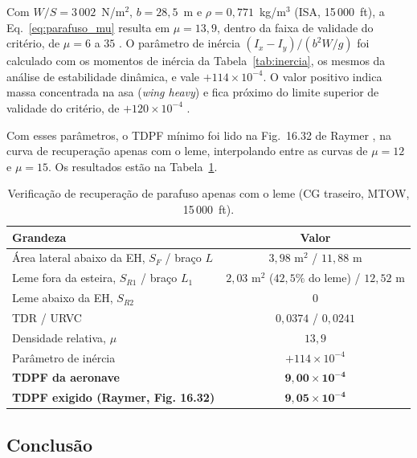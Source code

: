 Com $W/S = 3\,002$~N/m$^2$, $b = 28{,}5$~m e $\rho = 0{,}771$~kg/m$^3$ (ISA, 15\,000~ft), a Eq.~\eqref{eq:parafuso_mu} resulta em $\mu = 13{,}9$, dentro da faixa de validade do critério, de $\mu = 6$ a $35$ \cite{bowman1971}. O parâmetro de inércia $(I_x - I_y)/(b^2 W/g)$ foi calculado com os momentos de inércia da Tabela~\ref{tab:inercia}, os mesmos da análise de estabilidade dinâmica, e vale $+114\times10^{-4}$. O valor positivo indica massa concentrada na asa (\textit{wing heavy}) e fica próximo do limite superior de validade do critério, de $+120\times10^{-4}$ \cite{bowman1971}.

Com esses parâmetros, o TDPF mínimo foi lido na Fig.~16.32 de Raymer \cite{raymer2018}, na curva de recuperação apenas com o leme, interpolando entre as curvas de $\mu = 12$ e $\mu = 15$. Os resultados estão na Tabela~\ref{tab:parafuso_tdpf}.

\begin{table}[H]
    \centering
    \caption{Verificação de recuperação de parafuso apenas com o leme (CG traseiro, MTOW, 15\,000~ft).}
    \begin{tabular}{|l|c|}
       \hline
       \textbf{Grandeza} & \textbf{Valor} \\
       \hline
       Área lateral abaixo da EH, $S_F$ / braço $L$ & $3{,}98$ m$^2$ / $11{,}88$ m \\
       \hline
       Leme fora da esteira, $S_{R1}$ / braço $L_1$ & $2{,}03$ m$^2$ ($42{,}5\%$ do leme) / $12{,}52$ m \\
       \hline
       Leme abaixo da EH, $S_{R2}$ & $0$ \\
       \hline
       TDR / URVC & $0{,}0374$ / $0{,}0241$ \\
       \hline
       Densidade relativa, $\mu$ & $13{,}9$ \\
       \hline
       Parâmetro de inércia & $+114\times10^{-4}$ \\
       \hline
       \textbf{TDPF da aeronave} & $\mathbf{9{,}00\times10^{-4}}$ \\
       \hline
       \textbf{TDPF exigido (Raymer, Fig. 16.32)} & $\mathbf{9{,}05\times10^{-4}}$ \\
       \hline
    \end{tabular}
    \label{tab:parafuso_tdpf}
\end{table}

\subsection{Conclusão}

